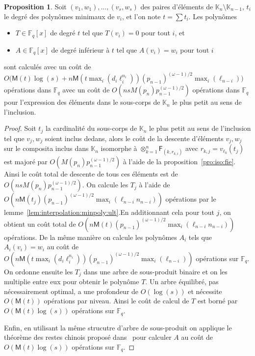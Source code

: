 \documentclass[10pt,a4paper]{book}
\theoremstyle{plain}
\theoremstyle{definition}
\theoremstyle{definition}
\theoremstyle{definition}
\newtheorem{prop}[thm]{Proposition}
\theoremstyle{definition}
\theoremstyle{remark}
\theoremstyle{remark}
\theoremstyle{definition}
\begin{document}
\begin{prop}
\label{pro:app:int}
  Soit $(v_1,w_1),\dots,(v_s,w_s)$ des paires d'éléments de $\mathbb{K}_n 
  \setminus \mathbb{K}_{n-1}$, $t_i$ le degré des polynômes minimaux de $v_i$, 
  et l'on note  $t=\sum t_i$. 
  Les polynômes
  \begin{itemize}
  \item $T\in \mathbb{F}_q[x]$ de degré $t$ tel que $T(v_i)=0$ pour tout $i$,
    et
  \item $A\in \mathbb{F}_q[x]$ de degré inférieur à $t$ tel que $A(v_i)=w_i$ pour
    tout $i$
  \end{itemize}
  sont calculés avec un coût de
  $O\bigl(\mathsf{M}(t)\log(s) + n\mathsf{M}(t \max_i(d_i\ell_i^{n_i}))(p_{n-1})^{(\omega-1)/2} \max_{i}(\ell_{n-i})\bigr)$ 
  opérations dans $\mathbb{F}_q$ avec un coût de 
  $O(nsM(p_n)p_{n-1}^{(\omega-1)/2})$ opérations dans $\mathbb{F}_q$ pour 
  l'expression des éléments dans le sous-corps de $\mathbb{K}_n$ le plus petit 
  au sens de l'inclusion.
\end{prop}
\begin{proof}
  Soit $t_j$ la cardinalité du sous-corps de $\mathbb{K}_n$ le plus petit au 
  sens  de l'inclusion tel que $v_j,w_j$ soient inclus dedans, alors le coût de
  la descente d'éléments $v_j,w_j$ sur le composita inclus dans $\mathbb{K}_n$ 
  isomorphe à $\otimes_{k=1}^n\mathsf{F}_{(k,r_{k,i})}$ avec 
  $r_{k,j}=v_{\ell_k}(t_j)$ est majoré par $O(M(p_n)p_{n-1}^{(\omega-1)/2})$ à 
  l'aide de la proposition~\ref{pro:iso:fie}. Ainsi le coût total de descente 
  de tous ces éléments est de $O(nsM(p_n)p_{n-1}^{(\omega-1)/2})$.
  On calcule les $T_j$ à l'aide de
   $O(n\mathsf{M}(t_j)(p_{n-1})^{(\omega-1)/2} \max_{i}(\ell_{n-i}n_{n-i}))$ 
  opérations par le lemme~\ref{lem:interpolation:minpoly:ult}.En additionnant 
  cela pour tout $j$, %
  on obtient un coût total de $O(n\mathsf{M}(t)(p_{n-1})^{(\omega-1)/2} \max_{i}(\ell_{n-i}n_{n-i}))$ opérations.
  De la même manière on calcule les polynômes $A_i$ tels que $A_i(v_i)=w_i$
  au coût de $O(n\mathsf{M}(t \max_i(d_i\ell_i^{n_i}))(p_{n-1})^{(\omega-1)/2} \max_{i}(\ell_{n-i}))$
  opérations sur $\mathbb{F}_q$.
  On ordonne ensuite les $T_j$ dans une arbre de sous-produit binaire et 
  on les multiplie entre eux pour obtenir le polynôme $T$. Un arbre équilibré, 
  pas nécessairement optimal, a une profondeur de $O(\log (s))$ et nécessite 
  $O(\mathsf{M}(t))$ opérations par niveau. Ainsi le coût de calcul de $T$ est 
  borné par $O(\mathsf{M}(t)\log(s))$ opérations sur $\mathbb{F}_q$.
  
  Enfin, en utilisant la même strucutre d'arbre de sous-produit on applique le 
  théorème des restes chinois proposé dans~\cite[Chapter~10]{vzGJG03} pour 
  calculer $A$ au coût de $O(\mathsf{M}(t)\log(s))$ opérations sur $\mathbb{F}_q$.
\end{proof}
\end{document}
